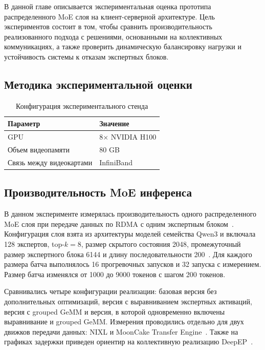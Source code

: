 В данной главе описывается экспериментальная оценка прототипа распределенного MoE слоя на клиент-серверной архитектуре. Цель экспериментов состоит в том, чтобы сравнить производительность реализованного подхода с решениями, основанными на коллективных коммуникациях, а также проверить динамическую балансировку нагрузки и устойчивость системы к отказам экспертных блоков.

\subsection{Методика экспериментальной оценки}

\begin{table}[ht!]
    \centering
    \caption{Конфигурация экспериментального стенда}
    \label{tab:experiment-setup}
    \begin{tabularx}{\textwidth}{|>{\RaggedRight\arraybackslash}p{}|X|}
        \hline
        \textbf{Параметр} & \textbf{Значение} \\
        \hline
        GPU & 8$\times$ NVIDIA H100 \\
        \hline
        Объем видеопамяти & 80 GB \\
        \hline
        Связь между видеокартами & InfiniBand \\
        \hline
    \end{tabularx}
\end{table}

\subsection{Производительность MoE инференса}

В данном эксперименте измерялась производительность одного распределенного MoE слоя при передаче данных по RDMA с одним экспертным блоком~\cite{nvidiaGpudirectRdma}. Конфигурация слоя взята из архитектуры моделей семейства Qwen3 и включала 128 экспертов, top-\(k = 8\), размер скрытого состояния 2048, промежуточный размер экспертного блока 6144 и длину последовательности 200~\cite{qwen2025qwen3}. Для каждого размера батча выполнялось 16 прогревочных запусков и 32 запуска с измерением. Размер батча изменялся от 1000 до 9000 токенов с шагом 200 токенов.

Сравнивались четыре конфигурации реализации: базовая версия без дополнительных оптимизаций, версия с выравниванием экспертных активаций, версия с grouped GeMM и версия, в которой одновременно включены выравнивание и grouped GeMM. Измерения проводились отдельно для двух движков передачи данных: NIXL и MoonCake Transfer Engine~\cite{nvidiaNixl,mooncakeTransferEngine}. Также на графиках задержки приведен ориентир на коллективную реализацию DeepEP~\cite{deepseekDeepEP}.


